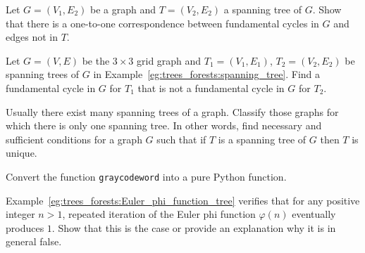 \begin{problem}
\item Let $G = (V_1, E_2)$ be a graph and $T = (V_2, E_2)$ a spanning
  tree of $G$. Show that there is a one-to-one correspondence between
  fundamental cycles in $G$ and edges not in
  $T$.

\item Let $G = (V,E)$ be the $3 \times 3$ grid graph
  and $T_1 = (V_1, E_1)$, $T_2 = (V_2, E_2)$ be spanning trees of $G$
  in Example~\ref{eg:trees_forests:spanning_tree}. Find a fundamental
  cycle in $G$ for $T_1$ that is not a fundamental cycle in $G$ for
  $T_2$.

\item Usually there exist many spanning trees of a graph. Classify
  those graphs for which there is only one spanning tree. In other
  words, find necessary and sufficient conditions for a graph $G$ such
  that if $T$ is a spanning tree of $G$ then $T$ is unique.

\item Convert the function \texttt{graycodeword} into a pure Python
  function.

\item Example~\ref{eg:trees_forests:Euler_phi_function_tree} verifies
  that for any positive integer $n > 1$, repeated iteration of the
  Euler phi function $\varphi(n)$ eventually
  produces $1$. Show that this is the case or provide an explanation
  why it is in general false.


\end{problem}
